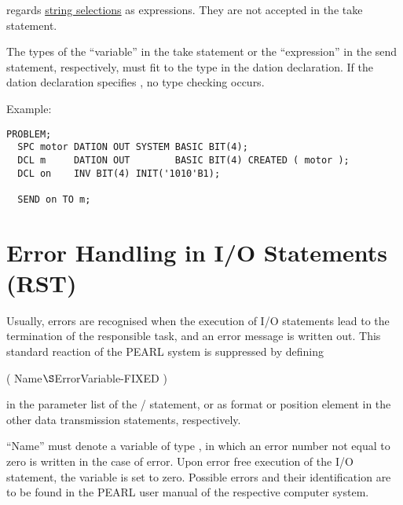 \OpenPEARL{} regards \hyperlink{StringSelection}{string selections} as
expressions. They are not accepted in the take statement.

The types of the ``variable'' in the take statement or the
``expression'' in the send statement, respectively, must fit to 
the type in the dation declaration. If the dation declaration 
specifies , no type checking occurs.


Example:


\begin{lstlisting}
PROBLEM;
  SPC motor DATION OUT SYSTEM BASIC BIT(4);
  DCL m     DATION OUT        BASIC BIT(4) CREATED ( motor );
  DCL on    INV BIT(4) INIT('1010'B1);

  SEND on TO m;
\end{lstlisting}

\section{Error Handling in I/O Statements (RST)}    %
\label{sec_dation_rst}

Usually, errors are recognised when the execution of I/O statements lead to the
termination of the responsible task, and an error message is written
out. This standard reaction of the PEARL system is suppressed by
defining

 ( Name$\S $ErrorVariable-FIXED )

in the parameter list of the / statement, or as format or
position element in the other data transmission statements,
respectively.

``Name'' must denote a variable of type , in which an error number
not equal to zero is written in the case of error. Upon error free
execution of the I/O statement, the variable is set to zero. Possible
errors and their identification are to be found in the PEARL user manual
of the respective computer system.

